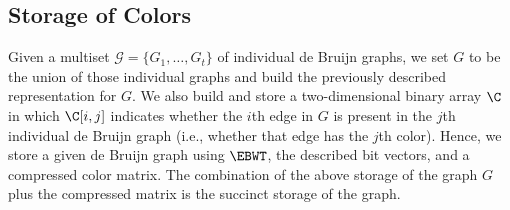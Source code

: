 


\subsection*{Storage of Colors} 

Given a multiset \(\mathcal{G} = \{G_1, \ldots, G_t\}\) of individual de Bruijn graphs, we set $G$ to be the union of those individual graphs and build the previously described representation for $G$.  We also build and store a two-dimensional binary array $\C$ in which \(\C [i, j]\) indicates whether the $i$th edge in $G$ is present in the $j$th individual de Bruijn graph (i.e., whether that edge has the $j$th color).    Hence, we store a given de Bruijn graph using $\EBWT$, the described bit vectors, and a compressed color matrix.  The combination of the above storage of the graph $G$ plus the compressed matrix is the succinct storage of the graph. 



